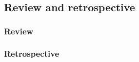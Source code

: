 \subsection{Review and retrospective}
\subsubsection{Review}
\subsubsection{Retrospective}
\newpage
